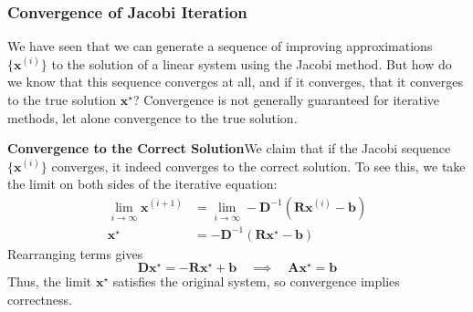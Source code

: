 \subsubsection{Convergence of Jacobi Iteration}
We have seen that we can generate a sequence of improving approximations $\{\mathbf{x}^{(i)}\}$ to the solution of a linear system using the Jacobi method. But how do we know that this sequence converges at all, and if it converges, that it converges to the true solution $\mathbf{x}^\star$? Convergence is not generally guaranteed for iterative methods, let alone convergence to the true solution.

\textbf{Convergence to the Correct Solution}\quad We claim that if the Jacobi sequence $\{\mathbf{x}^{(i)}\}$ converges, it indeed converges to the correct solution. To see this, we take the limit on both sides of the iterative equation:
\begin{align*}
    \lim_{i \to \infty} \mathbf{x}^{(i+1)} & = \lim_{i \to \infty} -\mathbf{D}^{-1}(\mathbf{R}\mathbf{x}^{(i)} - \mathbf{b}) \\
    \mathbf{x}^\star &= -\mathbf{D}^{-1}(\mathbf{R}\mathbf{x}^\star - \mathbf{b})
\end{align*}
Rearranging terms gives
\begin{equation*}
    \mathbf{D}\mathbf{x}^\star = -\mathbf{R}\mathbf{x}^\star + \mathbf{b} 
    \quad \implies \quad 
    \mathbf{A}\mathbf{x}^\star = \mathbf{b}
\end{equation*}
Thus, the limit $\mathbf{x}^\star$ satisfies the original system, so convergence implies correctness.

